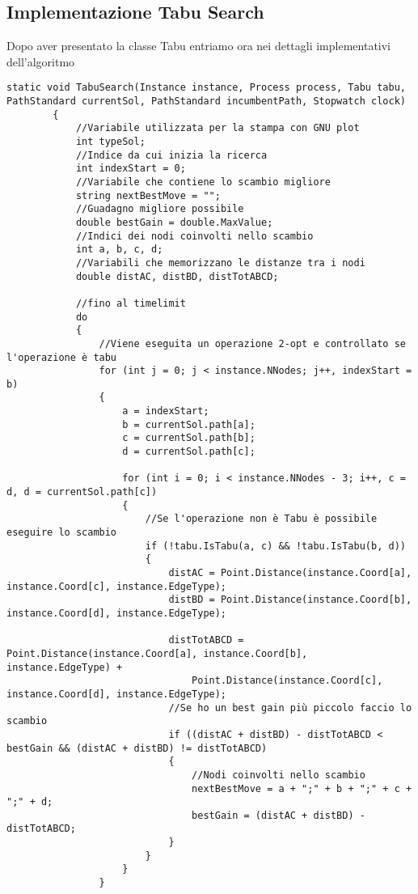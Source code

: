 \subsection{Implementazione Tabu Search}

Dopo aver presentato la classe Tabu entriamo ora nei dettagli implementativi dell'algoritmo

\begin{lstlisting}
static void TabuSearch(Instance instance, Process process, Tabu tabu, PathStandard currentSol, PathStandard incumbentPath, Stopwatch clock)
        {
            //Variabile utilizzata per la stampa con GNU plot
            int typeSol;
            //Indice da cui inizia la ricerca
            int indexStart = 0;
            //Variabile che contiene lo scambio migliore
            string nextBestMove = "";
            //Guadagno migliore possibile
            double bestGain = double.MaxValue;
            //Indici dei nodi coinvolti nello scambio
            int a, b, c, d;
            //Variabili che memorizzano le distanze tra i nodi
            double distAC, distBD, distTotABCD;

            //fino al timelimit
            do
            {
                //Viene eseguita un operazione 2-opt e controllato se l'operazione è tabu
                for (int j = 0; j < instance.NNodes; j++, indexStart = b)
                {
                    a = indexStart;
                    b = currentSol.path[a];
                    c = currentSol.path[b];
                    d = currentSol.path[c];

                    for (int i = 0; i < instance.NNodes - 3; i++, c = d, d = currentSol.path[c])
                    {
                        //Se l'operazione non è Tabu è possibile eseguire lo scambio
                        if (!tabu.IsTabu(a, c) && !tabu.IsTabu(b, d))
                        {
                            distAC = Point.Distance(instance.Coord[a], instance.Coord[c], instance.EdgeType);
                            distBD = Point.Distance(instance.Coord[b], instance.Coord[d], instance.EdgeType);

                            distTotABCD = Point.Distance(instance.Coord[a], instance.Coord[b], instance.EdgeType) +
                                Point.Distance(instance.Coord[c], instance.Coord[d], instance.EdgeType);
                            //Se ho un best gain più piccolo faccio lo scambio
                            if ((distAC + distBD) - distTotABCD < bestGain && (distAC + distBD) != distTotABCD)
                            {
                                //Nodi coinvolti nello scambio
                                nextBestMove = a + ";" + b + ";" + c + ";" + d;
                                bestGain = (distAC + distBD) - distTotABCD;
                            }
                        }
                    }
                }


\end{lstlisting}
